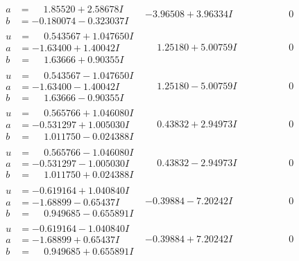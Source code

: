 \documentclass[1p]{elsarticle_modified}
\theoremstyle{definition}
\begin{document}
$$\begin{array}{c|c|c}
\begin{aligned}
a &= \phantom{-}1.85520 + 2.58678 I \\
b &= -0.180074 - 0.323037 I\end{aligned}
 & -3.96508 + 3.96334 I & \phantom{-0.000000 } 0 \\ \hline\begin{aligned}
u &= \phantom{-}0.543567 + 1.047650 I \\
a &= -1.63400 + 1.40042 I \\
b &= \phantom{-}1.63666 + 0.90355 I\end{aligned}
 & \phantom{-}1.25180 + 5.00759 I & \phantom{-0.000000 } 0 \\ \hline\begin{aligned}
u &= \phantom{-}0.543567 - 1.047650 I \\
a &= -1.63400 - 1.40042 I \\
b &= \phantom{-}1.63666 - 0.90355 I\end{aligned}
 & \phantom{-}1.25180 - 5.00759 I & \phantom{-0.000000 } 0 \\ \hline\begin{aligned}
u &= \phantom{-}0.565766 + 1.046080 I \\
a &= -0.531297 + 1.005030 I \\
b &= \phantom{-}1.011750 - 0.024388 I\end{aligned}
 & \phantom{-}0.43832 + 2.94973 I & \phantom{-0.000000 } 0 \\ \hline\begin{aligned}
u &= \phantom{-}0.565766 - 1.046080 I \\
a &= -0.531297 - 1.005030 I \\
b &= \phantom{-}1.011750 + 0.024388 I\end{aligned}
 & \phantom{-}0.43832 - 2.94973 I & \phantom{-0.000000 } 0 \\ \hline\begin{aligned}
u &= -0.619164 + 1.040840 I \\
a &= -1.68899 - 0.65437 I \\
b &= \phantom{-}0.949685 - 0.655891 I\end{aligned}
 & -0.39884 - 7.20242 I & \phantom{-0.000000 } 0 \\ \hline\begin{aligned}
u &= -0.619164 - 1.040840 I \\
a &= -1.68899 + 0.65437 I \\
b &= \phantom{-}0.949685 + 0.655891 I\end{aligned}
 & -0.39884 + 7.20242 I & \phantom{-0.000000 } 0 \\ \hline\begin{aligned}

\end{aligned}
\end{array}$$
\end{document}
